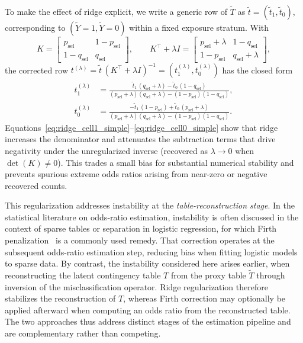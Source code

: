 \documentclass[pdflatex,sn-mathphys-num]{sn-jnl}%
\theoremstyle{thmstyleone}%
\theoremstyle{thmstyletwo}%
\theoremstyle{thmstylethree}%
\begin{document}
To make the effect of ridge explicit, we write a generic row of $\tilde T$ as $\tilde t=(\tilde t_1,\tilde t_0)$, corresponding to $(\tilde Y=1,\tilde Y=0)$ within a fixed exposure stratum. With
\[
K=\begin{bmatrix}
p_{\mathrm{sel}} & 1-p_{\mathrm{sel}}\\
1-q_{\mathrm{sel}} & q_{\mathrm{sel}}
\end{bmatrix},
\qquad
K^\top+\lambda I=
\begin{bmatrix}
p_{\mathrm{sel}}+\lambda & 1-q_{\mathrm{sel}}\\
1-p_{\mathrm{sel}} & q_{\mathrm{sel}}+\lambda
\end{bmatrix},
\]
the corrected row $t^{(\lambda)}=\tilde t\,(K^\top+\lambda I)^{-1}=(t^{(\lambda)}_1,t^{(\lambda)}_0)$ has the closed form
\begin{align}
t^{(\lambda)}_1
&=\frac{\tilde t_1\,(q_{\mathrm{sel}}+\lambda)-\tilde t_0\,(1-q_{\mathrm{sel}})}
{(p_{\mathrm{sel}}+\lambda)(q_{\mathrm{sel}}+\lambda)-(1-p_{\mathrm{sel}})(1-q_{\mathrm{sel}})},\label{eq:ridge_cell1_simple}\\
t^{(\lambda)}_0
&=\frac{-\tilde t_1\,(1-p_{\mathrm{sel}})+\tilde t_0\,(p_{\mathrm{sel}}+\lambda)}
{(p_{\mathrm{sel}}+\lambda)(q_{\mathrm{sel}}+\lambda)-(1-p_{\mathrm{sel}})(1-q_{\mathrm{sel}})}.\label{eq:ridge_cell0_simple}
\end{align}
Equations~\eqref{eq:ridge_cell1_simple}--\eqref{eq:ridge_cell0_simple} show that ridge increases the denominator and attenuates the subtraction terms that drive negativity under the unregularized inverse (recovered as $\lambda\to 0$ when $\det(K)\neq 0$).  This trades a small bias for substantial numerical stability and prevents spurious extreme odds ratios arising from near-zero or negative recovered counts.

This regularization addresses instability at the \emph{table-reconstruction stage}. In the statistical literature on odds-ratio estimation, instability is often discussed in the context of sparse tables or separation in logistic regression, for which Firth penalization~\cite{firth1993bias} is a commonly used remedy. That correction operates at the subsequent odds-ratio estimation step, reducing bias when fitting logistic models to sparse data.
%
By contrast, the instability considered here arises earlier, when reconstructing the latent contingency table $T$ from the proxy table $\tilde T$ through inversion of the misclassification operator. Ridge regularization therefore stabilizes the reconstruction of $T$, whereas Firth correction may optionally be applied afterward when computing an odds ratio from the reconstructed table. The two approaches thus address distinct stages of the estimation pipeline and are complementary rather than competing.
\end{document}
